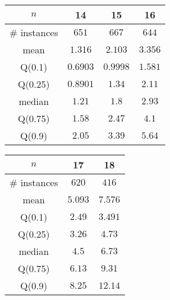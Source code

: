 \begin{tabular}{c|ccc} 
\hline 
$n$ & 14 & 15 & 16 \tabularnewline 
\hline 
\hline 
\# instances & $651$ & $667$ & $644$ \tabularnewline 
mean & $1.316$ & $2.103$ & $3.356$ \tabularnewline 
Q(0.1) & $0.6903$ & $0.9998$ & $1.581$ \tabularnewline 
Q(0.25) & $0.8901$ & $1.34$ & $2.11$ \tabularnewline 
median & $1.21$ & $1.8$ & $2.93$ \tabularnewline 
Q(0.75) & $1.58$ & $2.47$ & $4.1$ \tabularnewline 
Q(0.9) & $2.05$ & $3.39$ & $5.64$ \tabularnewline 
\hline 
\end{tabular} 
\medskip{} 

\begin{tabular}{c|cc} 
\hline 
$n$ & 17 & 18 \tabularnewline 
\hline 
\hline 
\# instances & $620$ & $416$ \tabularnewline 
mean & $5.093$ & $7.576$ \tabularnewline 
Q(0.1) & $2.49$ & $3.491$ \tabularnewline 
Q(0.25) & $3.26$ & $4.73$ \tabularnewline 
median & $4.5$ & $6.73$ \tabularnewline 
Q(0.75) & $6.13$ & $9.31$ \tabularnewline 
Q(0.9) & $8.25$ & $12.14$ \tabularnewline 
\hline 
\end{tabular} 
\medskip{} 

